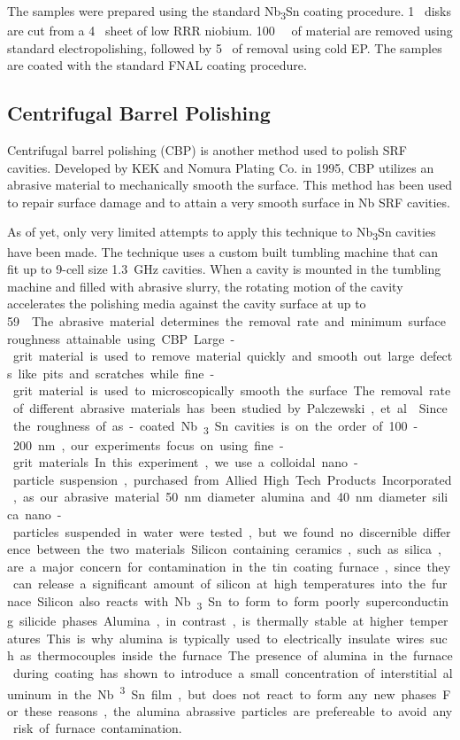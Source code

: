 \documentclass[reprint,amsmath,amssymb,aps]{revtex4-2}%
\begin{document}
The samples were prepared using the standard Nb\textsubscript{3}Sn coating procedure. 1~\si{\centimeter} disks are cut from a 4~\si{\millimeter} sheet of low RRR niobium. 100~\si{\micro\meters} of material are removed using standard electropolishing\cite{saito2003development}, followed by 5~\si{\micrometers} of removal using cold EP.\cite{crawford2017extreme} The samples are coated with the standard FNAL coating procedure.\cite{posen2017nb3sn}
%
\subsection{Centrifugal Barrel Polishing}%
\label{subsec:CentrifugalBarrelPolishing}%
Centrifugal barrel polishing (CBP) is another method used to polish SRF cavities. Developed by KEK and Nomura Plating Co. in 1995\cite{higuchi1996investigation}, CBP utilizes an abrasive material to mechanically smooth the surface. This method has been used to repair surface damage and to attain a very smooth surface in Nb SRF cavities\cite{cooper2012mirror, cooper2011centrifugal}. 

As of yet, only very limited attempts to apply this technique to Nb\textsubscript{3}Sn cavities have been made. The technique uses a custom built tumbling machine that can fit up to 9-cell size 1.3~GHz cavities. When a cavity is mounted in the tumbling machine and filled with abrasive slurry, the rotating motion of the cavity accelerates the polishing media against the cavity surface at up to 59~\si{\meters\per\second\square}. 

The abrasive material determines the removal rate and minimum surface roughness attainable using CBP. Large-grit material is used to remove material quickly and smooth out large defects like pits and scratches while fine-grit material is used to microscopically smooth the surface. The removal rate of different abrasive materials has been studied by Palczewski, et. al.\cite{palczewski2013exploration}

Since the roughness of as-coated Nb\textsubscript{3}Sn cavities is on the order of 100-200~nm, our experiments focus on using fine-grit materials. In this experiment, we use a colloidal nano-particle suspension, purchased from Allied High Tech Products Incorporated, as our abrasive material. 50~nm diameter alumina and 40~nm diameter silica nano-particles suspended in water were tested, but we found no discernible difference between the two materials.

Silicon containing ceramics, such as silica, are a major concern for contamination in the tin coating furnace, since they can release a significant amount of silicon at high temperatures into the furnace. Silicon also reacts with Nb\textsubscript{3}Sn to form to form poorly superconducting silicide phases. Alumina, in contrast, is thermally stable at higher temperatures. This is why alumina is typically used to electrically insulate wires such as thermocouples inside the furnace. The presence of alumina in the furnace during coating has shown to introduce a small concentration of interstitial aluminum in the Nb\textsuperscript{3}Sn film, but does not react to form any new phases. For these reasons, the alumina abrassive particles are prefereable to avoid any risk of furnace contamination.
\end{document}
